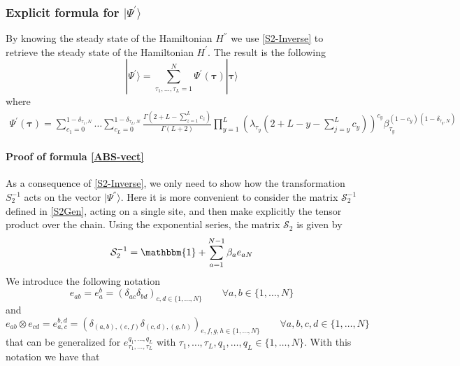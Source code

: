 \documentclass[10pt]{article}
\numberwithin{equation}{section}
\numberwithin{equation}{subsection}
\newcommand{\com}[1]{{ (* {\color{red}\small #1}*)}}
\begin{document}
\subsubsection{Explicit formula for $|\Psi^{'}\rangle$}\label{subsectionSSdual}
By knowing the steady state  of the Hamiltonian $H^{''}$ we use \eqref{S2-Inverse} to retrieve the steady state of the Hamiltonian $H^{'}$. The result is the following 
\begin{equation}\label{ABS-vect}
    |\Psi^{'}\rangle =\sum_{\tau_{1},\ldots,\tau_{L}=1}^{N}\Psi^{'}(\bm{\tau})|\bm{\tau}\rangle 
\end{equation}
where  
\begin{equation}\label{ABS}
		\begin{split}
			\Psi^{'}(\bm{\tau})=\sum_{c_{1}=0}^{1-\delta_{\tau_{1},N}}\ldots\sum_{c_{L}=0}^{1-\delta_{\tau_{L},N}}\frac{\Gamma(2+L-\sum_{z=1}^{L}c_{z})}{\Gamma(L+2)}\prod_{y=1}^{L}\left(\lambda_{\tau_{y}}\left(2+L-y-\sum_{j=y}^{L}c_{y}\right)\right)^{c_{y}}\beta_{\tau_{y}}^{(1-c_{y})(1-\delta_{\tau_{y},N})}
		\end{split}
	\end{equation} 
\paragraph{Proof of formula \eqref{ABS-vect}} As a consequence of \eqref{S2-Inverse}, we only need to show how the transformation $S_{2}^{-1}$ acts on the vector $|\Psi^{''}\rangle$. Here it is more convenient to consider the matrix $\mathcal{S}_{2}^{-1}$ defined in \eqref{S2Gen}, acting on a single site, and then make explicitly the tensor product over the chain. Using the exponential series, the matrix $\mathcal{S}_{2}$ is given by 
\begin{equation}
   \mathcal{S}_{2}^{-1}=\mathbbm{1}+\sum_{a=1}^{N-1}\beta_{a}e_{aN}
\end{equation}
We introduce the following notation
\begin{equation}\label{notation1}
    e_{ab}=e_{a}^{b}=\left(\delta_{ac}\delta_{bd}\right)_{c,d\in\{1,\ldots,N\}}\qquad \forall a,b\in \{1,\ldots,N\}
\end{equation}
and 
\begin{equation}\label{notation2}
    e_{ab}\otimes e_{cd}=e_{a,c}^{b,d}=\left(\delta_{(a,b),(e,f)}\delta_{(c,d),(g,h)}\right)_{e,f,g,h\in \{1,\ldots,N\}}\qquad \forall a,b,c,d\in \{1,\ldots,N\}
    \end{equation}
    that can be generalized for $e_{\tau_{1},\ldots,\tau_{L}}^{q_{1},\ldots,q_{L}}$ with $\tau_{1},\ldots,\tau_{L},q_{1},\ldots,q_{L}\in \{1,\ldots,N\}$. With this notation we have that
    
\end{document}
